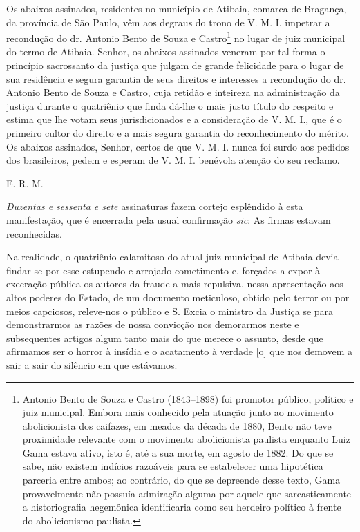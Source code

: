 Os abaixos assinados, residentes no município de Atibaia, comarca de
Bragança, da província de São Paulo, vêm aos degraus do trono de V. M. I.
impetrar a recondução do dr. Antonio Bento de Souza e Castro\footnote{
  Antonio Bento de Souza e Castro (1843--1898) foi promotor público,
  político e juiz municipal. Embora mais conhecido pela atuação junto ao
  movimento abolicionista dos caifazes, em meados da década de 1880,
  Bento não teve proximidade relevante com o movimento abolicionista
  paulista enquanto Luiz Gama estava ativo, isto é, até a sua morte, em
  agosto de 1882. Do que se sabe, não existem indícios razoáveis para se
  estabelecer uma hipotética parceria entre ambos; ao contrário, do que
  se depreende desse texto, Gama provavelmente não possuía admiração
  alguma por aquele que sarcasticamente a historiografia hegemônica
  identificaria como seu herdeiro político à frente do abolicionismo
  paulista.} no lugar de juiz municipal do termo de Atibaia. Senhor, os
abaixos assinados veneram por tal forma o princípio sacrossanto da
justiça que julgam de grande felicidade para o lugar de sua residência e
segura garantia de seus direitos e interesses a recondução do dr.
Antonio Bento de Souza e Castro, cuja retidão e inteireza na
administração da justiça durante o quatriênio que finda dá-lhe o mais
justo título do respeito e estima que lhe votam seus jurisdicionados e a
consideração de V. M. I., que é o primeiro cultor do direito e a mais
segura garantia do reconhecimento do mérito. Os abaixos assinados,
Senhor, certos de que V. M. I. nunca foi surdo aos pedidos dos
brasileiros, pedem e esperam de V. M. I. benévola atenção do seu
reclamo.

E. R. M.

\emph{Duzentas e sessenta e sete} assinaturas fazem cortejo esplêndido à
esta manifestação, que é encerrada pela usual confirmação \emph{sic}: As
firmas estavam reconhecidas.

Na realidade, o quatriênio calamitoso do atual juiz municipal de Atibaia
devia findar-se por esse estupendo e arrojado cometimento e, forçados a
expor à execração pública os autores da fraude a mais repulsiva, nessa
apresentação aos altos poderes do Estado, de um documento meticuloso,
obtido pelo terror ou por meios capciosos, releve-nos o público e S.
Excia o ministro da Justiça se para demonstrarmos as razões de nossa
convicção nos demorarmos neste e subsequentes artigos algum tanto mais
do que merece o assunto, desde que afirmamos ser o horror à insídia e o
acatamento à verdade {[}o{]} que nos demovem a sair a sair do silêncio
em que estávamos.

